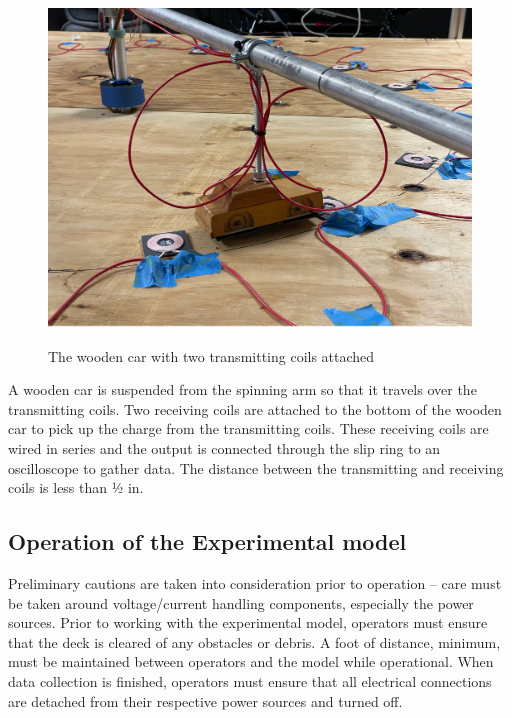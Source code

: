\begin{figure}
    \begin{center}
    \includegraphics[width=5in]{fig8.jpg}
    \end{center}
    \renewcommand{\baselinestretch}{1}
    \small\normalsize
    \begin{quote}
    \caption[The wooden car with two transmitting coils attached]{The wooden car with two transmitting coils attached} \label{fig: f8}
    \end{quote}
\end{figure}

A wooden car is suspended from the spinning arm so that it travels over the transmitting coils. 
Two receiving coils are attached to the bottom of the wooden car to pick up the charge from the transmitting coils. 
These receiving coils are wired in series and the output is connected through the slip ring to an oscilloscope to 
gather data. The distance between the transmitting and receiving coils is less than ½ in.

\subsection{Operation of the Experimental model}
Preliminary cautions are taken into consideration prior to operation – care must be taken around voltage/current 
handling components, especially the power sources. Prior to working with the experimental model, operators must 
ensure that the deck is cleared of any obstacles or debris. A foot of distance, minimum, must be maintained 
between operators and the model while operational. When data collection is finished, operators must ensure 
that all electrical connections are detached from their respective power sources and turned off.

